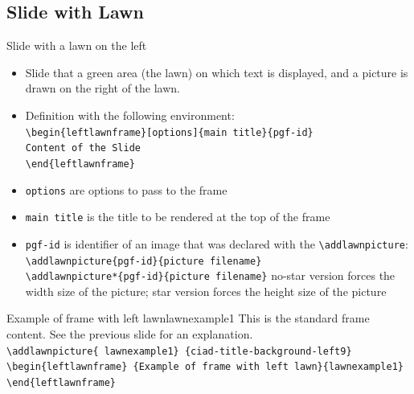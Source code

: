 \documentclass[english,sectioncirclenumberstyle]{ciadbeamer}
\begin{document}
\subsection{Slide with Lawn}

\begin{frame}{Slide with a lawn on the left}
	\begin{itemize}
		\item Slide that a green area (the lawn) on which text is displayed, and a picture is drawn on the right of the lawn.
		\item Definition with the following environment: \\
		\texttt{{\textbackslash}begin\{leftlawnframe\}[options]\{main title\}\{pgf-id\}} \\
		\texttt{Content of the Slide} \\
		\texttt{{\textbackslash}end\{leftlawnframe\}}
		\item \texttt{options} are options to pass to the frame
		\item \texttt{main title} is the title to be rendered at the top of the frame
		\item \texttt{pgf-id} is identifier of an image that was declared with the \texttt{{\textbackslash}addlawnpicture}: \\
		\texttt{{\textbackslash}addlawnpicture\{pgf-id\}\{picture filename\}} \\
		\texttt{{\textbackslash}addlawnpicture*\{pgf-id\}\{picture filename\}}
		no-star version forces the width size of the picture; star version forces the height size of the picture
	\end{itemize}
\end{frame}

\begin{leftlawnframe}{{Example of frame} with left lawn}{lawnexample1}
	This is the standard frame content. See the previous slide for an explanation. \\[.5cm]
	\smaller
	\texttt{{\textbackslash}addlawnpicture\{ lawnexample1\} \{ciad-title-background-left9\}} \\
	\texttt{{\textbackslash}begin\{leftlawnframe\} \{Example of frame with left lawn\}\{lawnexample1\}} \\
	\texttt{{\textbackslash}end\{leftlawnframe\}}
\end{leftlawnframe}
\end{document}
